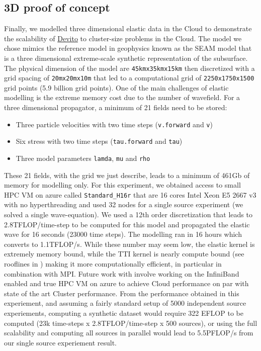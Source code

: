 \documentclass[conference]{IEEEtran}
\begin{document}
\subsection{3D proof of concept}\label{d-proof-of-concept}

Finally, we modelled three dimensional elastic data in the Cloud to
demonstrate the scalability of
\href{https://github.com/devitocodes/devito}{Devito} to cluster-size
problems in the Cloud. The model we chose mimics the reference model in
geophysics known as the SEAM model \cite{fehler2011seam} that is a
three dimensional extreme-scale synthetic representation of the
subsurface. The physical dimension of the model are
\texttt{45kmx35kmx15km} then discretized with a grid spacing of
\texttt{20mx20mx10m} that led to a computational grid of
\texttt{2250x1750x1500} grid points (5.9 billion grid points). One of
the main challenges of elastic modelling is the extreme memory cost due
to the number of wavefield. For a three dimensional propagator, a
minimum of 21 fields need to be stored:

\begin{itemize}
\itemsep1pt\parskip0pt
\item
  Three particle velocities with two time steps (\texttt{v.forward} and
  \texttt{v})
\item
  Six stress with two time steps (\texttt{tau.forward} and \texttt{tau})
\item
  Three model parameters \texttt{lamda}, \texttt{mu} and \texttt{rho}
\end{itemize}

These 21 fields, with the grid we just describe, leads to a minimum of
461Gb of memory for modelling only. For this experiment, we obtained
access to small HPC VM on azure called \texttt{Standard\_H16r} that are
16 cores Intel Xeon E5 2667 v3 with no hyperthreading and used 32 nodes
for a single source experiment (we solved a single wave-equation). We
used a 12th order discretization that leads to 2.8TFLOP/time-step to be
computed for this model and propagated the elastic wave for 16 seconds
(23000 time steps). The modelling ran in 16 hours which converts to
1.1TFLOP/s. While these number may seem low, the elastic kernel is
extremely memory bound, while the TTI kernel is nearly compute bound
(see rooflines in \cite{louboutin2016ppf, devito-api, devito-compiler})
making it more computationally efficient, in particular in combination
with MPI. Future work with involve working on the InfiniBand enabled and
true HPC VM on azure to achieve Cloud performance on par with state of
the art Cluster performance. From the performance obtained in this
experiement, and assuming a fairly standard setup of 5000 independent
source experiements, computing a synthetic dataset would require 322
EFLOP to be computed (23k time-steps x 2.8TFLOP/time-step x 500
sources), or using the full scalability and computing all sources in
parallel would lead to 5.5PFLOP/s from our single source experiement
result.
\end{document}
